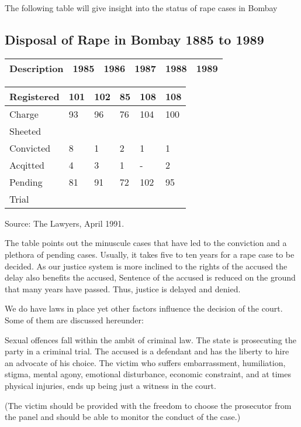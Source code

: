 \begin{multicols}{2}
\noi
The following table will give insight into the status of rape cases in Bombay

\subsection*{Disposal of Rape in Bombay 1885 to 1989}
\begin{tabular}{|l|l|l|l|l|l|}
\hline
Description & 1985 & 1986 & 1987 & 1988 & 1989\\
\hline
\end{tabular}

\begin{tabular}{|l|l|l|l|l|l|}
\hline
Registered & 101 & 102 & 85 & 108 & 108\\
\hline
Charge & 93 & 96 & 76 & 104 & 100\\
Sheeted &   &    &    &     &    \\
\hline
Convicted & 8 & 1 & 2 & 1 &1 \\
\hline
Acqitted & 4 & 3 & 1 &-& 2\\
\hline
Pending & 81 & 91 & 72 & 102 & 95\\
Trial   &    &    &    &     &    \\
\hline
\end{tabular}
Source: The Lawyers, April 1991.

\noi
The table points out the minuscule cases that have led to the conviction and a plethora
of pending cases. Usually, it takes five to ten years for a rape case to be decided. As our
justice system is more inclined to the rights of the accused the delay also benefits the
accused, Sentence of the accused is reduced on the ground that many years have passed.
Thus, justice is delayed and denied.


\noi
We do have laws in place yet other factors influence the decision of the court. Some of
them are discussed hereunder:


\noi
Sexual offences fall within the ambit of criminal law. The state is prosecuting the party
in a criminal trial. The accused is a defendant and has the liberty to hire an advocate of
his choice. The victim who suffers embarrassment, humiliation, stigma, mental agony,
emotional disturbance, economic constraint, and at times physical injuries, ends up
being just a witness in the court.

\noi
(The victim should be provided with the freedom to choose the prosecutor from the
panel and should be able to monitor the conduct of the case.)


\end{multicols}
